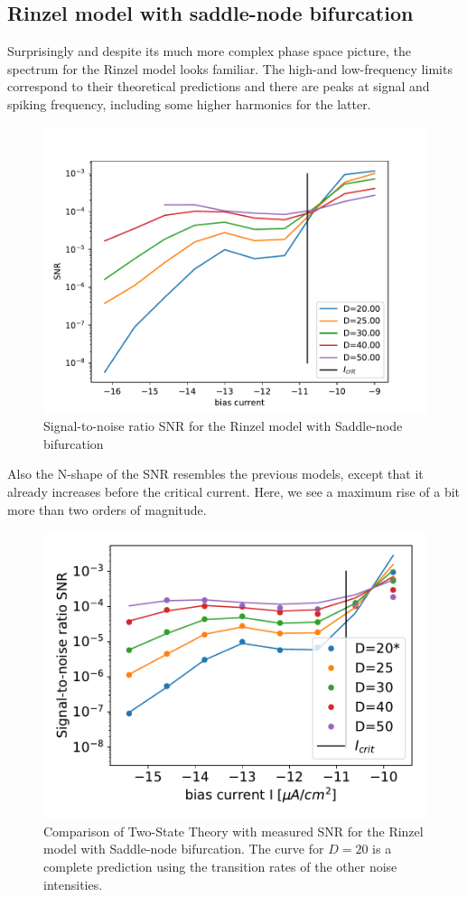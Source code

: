 \documentclass[12pt,a4paper]{article}
\begin{document}
\subsection{Rinzel model with saddle-node bifurcation}
Surprisingly and despite its much more complex phase space picture, the spectrum for the Rinzel model looks familiar. The high-and low-frequency limits correspond to their theoretical predictions and there are peaks at signal and spiking frequency, including some higher harmonics for the latter.
\begin{figure}[H]
	\centering
	\includegraphics[scale=1]{snrinzelcrit.pdf}\caption{Signal-to-noise ratio SNR for the Rinzel model with Saddle-node bifurcation}
	\label{specrinzel}
\end{figure}
Also the N-shape of the SNR resembles the previous models, except that it already increases before the critical current. Here, we see a maximum rise of a bit more than two orders of magnitude.  
\begin{figure}[H]
	\centering
	\includegraphics[scale=1]{snrinzelrange26dcompletecritnofit2.pdf}\caption{Comparison of Two-State Theory with measured SNR for the Rinzel model with Saddle-node bifurcation. The curve for $D=20$ is a complete prediction using the transition rates of the other noise intensities.}
	\label{specrinzeltst}
\end{figure}
\end{document}
